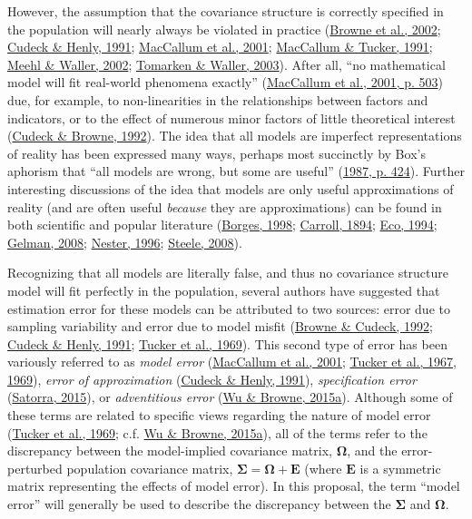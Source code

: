 \documentclass[11pt]{umnthesis}
\begin{document}
However, the assumption that the covariance structure is correctly specified in the population will nearly always be violated in practice (\protect\hyperlink{ref-browne2002}{Browne et al., 2002}; \protect\hyperlink{ref-cudeck1991}{Cudeck \& Henly, 1991}; \protect\hyperlink{ref-maccallum2001}{MacCallum et al., 2001}; \protect\hyperlink{ref-maccallum1991}{MacCallum \& Tucker, 1991}; \protect\hyperlink{ref-meehl2002}{Meehl \& Waller, 2002}; \protect\hyperlink{ref-tomarken2003}{Tomarken \& Waller, 2003}). After all, ``no mathematical model will fit real-world phenomena exactly'' (\protect\hyperlink{ref-maccallum2001}{MacCallum et al., 2001, p. 503}) due, for example, to non-linearities in the relationships between factors and indicators, or to the effect of numerous minor factors of little theoretical interest (\protect\hyperlink{ref-cudeck1992}{Cudeck \& Browne, 1992}). The idea that all models are imperfect representations of reality has been expressed many ways, perhaps most succinctly by Box's aphorism that ``all models are wrong, but some are useful'' (\protect\hyperlink{ref-box1987}{1987, p. 424}). Further interesting discussions of the idea that models are only useful approximations of reality (and are often useful \emph{because} they are approximations) can be found in both scientific and popular literature (\protect\hyperlink{ref-borges1998}{Borges, 1998}; \protect\hyperlink{ref-carroll1894}{Carroll, 1894}; \protect\hyperlink{ref-eco1994}{Eco, 1994}; \protect\hyperlink{ref-gelman2008}{Gelman, 2008}; \protect\hyperlink{ref-nester1996}{Nester, 1996}; \protect\hyperlink{ref-steele2008}{Steele, 2008}).

Recognizing that all models are literally false, and thus no covariance structure model will fit perfectly in the population, several authors have suggested that estimation error for these models can be attributed to two sources: error due to sampling variability and error due to model misfit (\protect\hyperlink{ref-browne1992}{Browne \& Cudeck, 1992}; \protect\hyperlink{ref-cudeck1991}{Cudeck \& Henly, 1991}; \protect\hyperlink{ref-tucker1969}{Tucker et al., 1969}). This second type of error has been variously referred to as \emph{model error} (\protect\hyperlink{ref-maccallum2001}{MacCallum et al., 2001}; \protect\hyperlink{ref-tucker1967evaluation}{Tucker et al., 1967}, \protect\hyperlink{ref-tucker1969}{1969}), \emph{error of approximation} (\protect\hyperlink{ref-cudeck1991}{Cudeck \& Henly, 1991}), \emph{specification error} (\protect\hyperlink{ref-satorra2015}{Satorra, 2015}), or \emph{adventitious error} (\protect\hyperlink{ref-wu2015}{Wu \& Browne, 2015a}). Although some of these terms are related to specific views regarding the nature of model error (\protect\hyperlink{ref-tucker1969}{Tucker et al., 1969}; c.f. \protect\hyperlink{ref-wu2015}{Wu \& Browne, 2015a}), all of the terms refer to the discrepancy between the model-implied covariance matrix, \(\bm{\Omega}\), and the error-perturbed population covariance matrix, \(\bm{\Sigma} = \bm{\Omega} + \mathbf{E}\) (where \(\mathbf{E}\) is a symmetric matrix representing the effects of model error). In this proposal, the term ``model error'' will generally be used to describe the discrepancy between the \(\bm{\Sigma}\) and \(\bm{\Omega}\).
\end{document}
